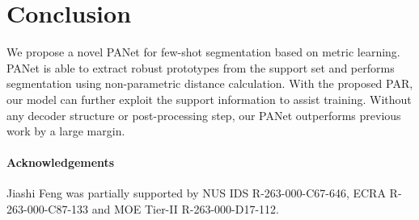 \documentclass[10pt,twocolumn,letterpaper]{article}
\begin{document}
\section{Conclusion}
We propose a novel PANet for few-shot segmentation based on metric learning. PANet is able to extract robust prototypes from the support set and performs segmentation using non-parametric distance calculation. With the proposed PAR, our model can further exploit the support information to assist training. Without any decoder structure or post-processing step, our PANet outperforms previous work by a large margin.

\vspace{-5pt}
\paragraph{Acknowledgements} Jiashi Feng was partially supported by NUS IDS R-263-000-C67-646,  ECRA R-263-000-C87-133 and MOE Tier-II R-263-000-D17-112.



{\small


}
\end{document}
